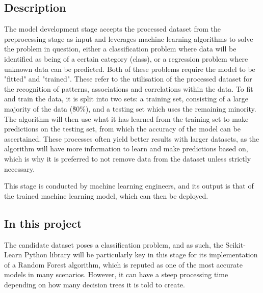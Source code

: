 \documentclass[12pt]{report}
\begin{document}
\subsection{Description}
The model development stage accepts the processed dataset from the preprocessing stage as input and leverages 
machine learning algorithms to solve the problem in question, either a classification problem where 
data will be identified as being of a certain category (class), or a regression problem where unknown 
data can be predicted. Both of these problems require the model to be "fitted" and "trained".
These refer to the utilisation of the processed dataset for the recognition of patterns, 
associations and correlations within the data. To fit and train the data, it is split into two sets:
a training set, consisting of a large majority of the data (\~80\%), and a testing set which uses the 
remaining minority. The algorithm will then use what it has learned from the training set to make predictions 
on the testing set, from which the accuracy of the model can be ascertained. These processes often yield better
results with larger datasets, as the algorithm will have more information to learn and make predictions based on,
which is why it is preferred to not remove data from the dataset unless strictly necessary.

This stage is conducted by machine learning engineers, and its output is that of the trained machine learning 
model, which can then be deployed.


\subsection{In this project}
The candidate dataset poses a classification problem, and as such, the Scikit-Learn Python library 
will be particularly key in this stage for its implementation of a Random Forest algorithm, which is 
reputed as one of the most accurate models in many scenarios. However, it can have a steep processing
time depending on how many decision trees it is told to create. 
\end{document}
